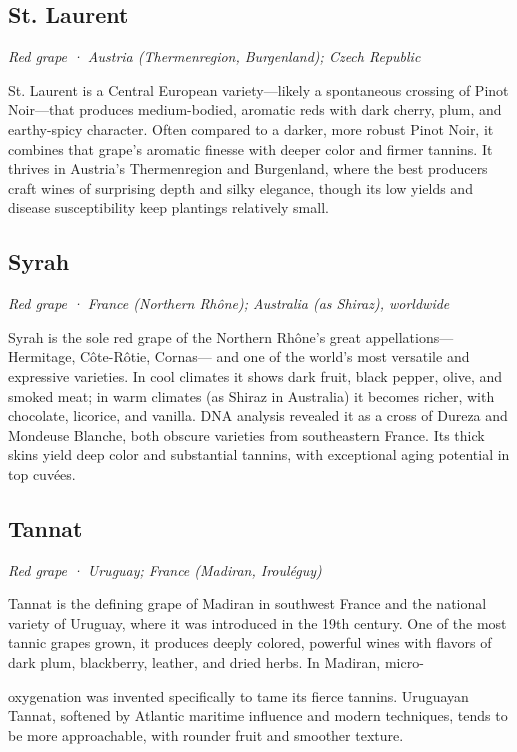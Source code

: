 \subsection*{St. Laurent}
\textit{Red grape · Austria (Thermenregion, Burgenland); Czech Republic}\par\smallskip

St. Laurent is a Central European variety—likely a spontaneous crossing of Pinot Noir—that produces medium-bodied, aromatic reds with dark cherry, plum, and earthy-spicy character. Often compared to a darker, more robust Pinot Noir, it combines that grape’s aromatic finesse with deeper color and firmer tannins. It thrives in Austria’s Thermenregion and Burgenland, where the best producers craft wines of surprising depth and silky elegance, though its low yields and disease susceptibility keep plantings relatively small.

\subsection*{Syrah}
\textit{Red grape · France (Northern Rhône); Australia (as Shiraz), worldwide}\par\smallskip

Syrah is the sole red grape of the Northern Rhône’s great appellations—Hermitage, Côte-Rôtie, Cornas— and one of the world’s most versatile and expressive varieties. In cool climates it shows dark fruit, black pepper, olive, and smoked meat; in warm climates (as Shiraz in Australia) it becomes richer, with chocolate, licorice, and vanilla. DNA analysis revealed it as a cross of Dureza and Mondeuse Blanche, both obscure varieties from southeastern France. Its thick skins yield deep color and substantial tannins, with exceptional aging potential in top cuvées.

\subsection*{Tannat}
\textit{Red grape · Uruguay; France (Madiran, Irouléguy)}\par\smallskip

Tannat is the defining grape of Madiran in southwest France and the national variety of Uruguay, where it was introduced in the 19th century. One of the most tannic grapes grown, it produces deeply colored, powerful wines with flavors of dark plum, blackberry, leather, and dried herbs. In Madiran, micro-

oxygenation was invented specifically to tame its fierce tannins. Uruguayan Tannat, softened by Atlantic maritime influence and modern techniques, tends to be more approachable, with rounder fruit and smoother texture.

